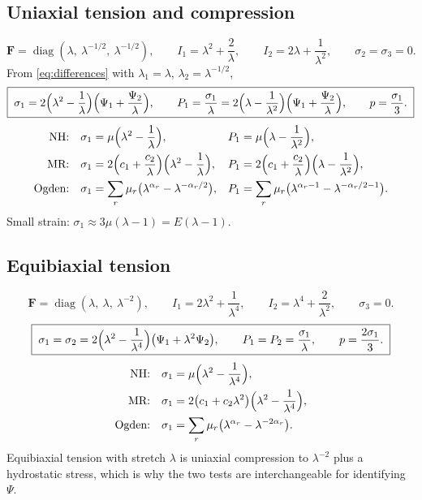 \documentclass[11pt]{article}
\newcommand{\bF}{\bm{F}}
\newcommand{\Ione}{I_1}
\newcommand{\Itwo}{I_2}
\newcommand{\Pone}{\Psi_{1}}
\newcommand{\Ptwo}{\Psi_{2}}
\begin{document}
\subsection{Uniaxial tension and compression}
\begin{equation}
  \bF = \operatorname{diag}(\lambda,\ \lambda^{-1/2},\ \lambda^{-1/2}), \qquad
  \Ione = \lambda^2 + \frac{2}{\lambda}, \qquad
  \Itwo = 2\lambda + \frac{1}{\lambda^2}, \qquad
  \sigma_2 = \sigma_3 = 0 .
\end{equation}
From \eqref{eq:differences} with $\lambda_1 = \lambda$,
$\lambda_2 = \lambda^{-1/2}$,
\begin{equation}
  \boxed{\;
  \sigma_1 = 2\Bigl(\lambda^2 - \frac1\lambda\Bigr)\Bigl(\Pone + \frac{\Ptwo}{\lambda}\Bigr),
  \qquad
  P_1 = \frac{\sigma_1}{\lambda} = 2\Bigl(\lambda - \frac1{\lambda^2}\Bigr)\Bigl(\Pone + \frac{\Ptwo}{\lambda}\Bigr),
  \qquad
  p = \frac{\sigma_1}{3}.\;}
\end{equation}
\begin{align}
  \text{NH:}\quad & \sigma_1 = \mu\Bigl(\lambda^2 - \frac1\lambda\Bigr), &
  P_1 &= \mu\Bigl(\lambda - \frac1{\lambda^2}\Bigr), \\
  \text{MR:}\quad & \sigma_1 = 2\Bigl(c_1 + \frac{c_2}{\lambda}\Bigr)\Bigl(\lambda^2 - \frac1\lambda\Bigr), &
  P_1 &= 2\Bigl(c_1 + \frac{c_2}{\lambda}\Bigr)\Bigl(\lambda - \frac1{\lambda^2}\Bigr), \\
  \text{Ogden:}\quad & \sigma_1 = \sum_r\mu_r\bigl(\lambda^{\alpha_r} - \lambda^{-\alpha_r/2}\bigr), &
  P_1 &= \sum_r\mu_r\bigl(\lambda^{\alpha_r-1} - \lambda^{-\alpha_r/2-1}\bigr).
\end{align}
Small strain: $\sigma_1 \approx 3\mu(\lambda - 1) = E(\lambda - 1)$.

\subsection{Equibiaxial tension}
\begin{equation}
  \bF = \operatorname{diag}(\lambda,\ \lambda,\ \lambda^{-2}), \qquad
  \Ione = 2\lambda^2 + \frac1{\lambda^4}, \qquad
  \Itwo = \lambda^4 + \frac{2}{\lambda^2}, \qquad
  \sigma_3 = 0 .
\end{equation}
\begin{equation}
  \boxed{\;
  \sigma_1 = \sigma_2 = 2\Bigl(\lambda^2 - \frac1{\lambda^4}\Bigr)\bigl(\Pone + \lambda^2\Ptwo\bigr),
  \qquad
  P_1 = P_2 = \frac{\sigma_1}{\lambda},
  \qquad
  p = \frac{2\sigma_1}{3}.\;}
\end{equation}
\begin{align}
  \text{NH:}\quad & \sigma_1 = \mu\Bigl(\lambda^2 - \frac1{\lambda^4}\Bigr), \\
  \text{MR:}\quad & \sigma_1 = 2\bigl(c_1 + c_2\lambda^2\bigr)\Bigl(\lambda^2 - \frac1{\lambda^4}\Bigr), \\
  \text{Ogden:}\quad & \sigma_1 = \sum_r\mu_r\bigl(\lambda^{\alpha_r} - \lambda^{-2\alpha_r}\bigr).
\end{align}
Equibiaxial tension with stretch $\lambda$ is uniaxial compression to
$\lambda^{-2}$ plus a hydrostatic stress, which is why the two tests are
interchangeable for identifying $\Psi$.
\end{document}
